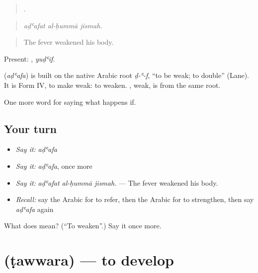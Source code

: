 \begin{quote}
  .
\end{quote}

\begin{quote}
\emph{aḍʿafat al-ḥummā jismah.}
\end{quote}

\begin{quote}
The fever weakened his body.
\end{quote}

Present: , \emph{yuḍʿif}.

\begin{cousinweb}
\textbf{} (\emph{aḍʿafa}) is built on the native Arabic root \emph{ḍ-ʿ-f}, \textquotedblleft{}to be weak; to double\textquotedblright{} (Lane). It is Form IV, to make weak: to weaken. , weak, is from the same root.
\end{cousinweb}

\begin{grammarlens}[title={What you've built}]
One more word for saying what happens if.
\end{grammarlens}

\subsection*{Your turn}
\begin{itemize}
\raggedright
  \item \emph{Say it:} \emph{aḍʿafa}
  \item \emph{Say it:} \emph{aḍʿafa}, once more
  \item \emph{Say it:} \emph{aḍʿafat al-ḥummā jismah.} — The fever weakened his body.
  \item \emph{Recall:} say the Arabic for to refer, then the Arabic for to strengthen, then say \emph{aḍʿafa} again
\end{itemize}

\begin{tcolorbox}[breakable,colback=teal!4,colframe=teal!35!black,title={Before you move on}]
What does  mean? (\textquotedblleft{}To weaken\textquotedblright{}.) Say it once more.
\end{tcolorbox}
\section[\texorpdfstring{\ar{طور} (ṭawwara)}{طور (ṭawwara)}]{ (ṭawwara) — to develop}

